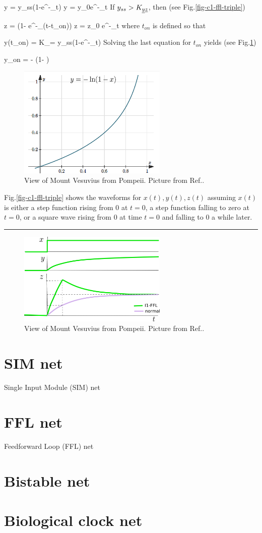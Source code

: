 \beq
y = y_{ss}(1-e^{-\alp_\rvy t})
\eeq
\beq \nonumber \color{red}
y = y_0e^{-\alp_\rvy t}
\eeq
If $y_{ss}> K_{\rvy\rvz}$, then (see Fig.\ref{fig-c1-ffl-triple})


\beq
z = \frac{\beta_\rvz}{\alp_\rvz}(1- e^{-\alp_\rvz (t-t_{on})})
\eeq
\beq\nonumber
\color{red}
z = z_0 e^{-\alp_\rvz t}
\eeq
where $t_{on}$ is defined so that

\beq
y(t_{on}) = K_{\rvy\rvz}= y_{ss}(1-e^{-\alp_\rvy t})
\eeq
Solving the last equation for $t_{on}$ yields (see 
Fig.\ref{fig-minus-log-1-minus-x.png})

\beq
y_{on} = -\;
\ln
\left({1- }
\right)
\eeq

\begin{figure}[h!]
\centering
\includegraphics[width=2.8in]
{autoregulons/-log(1-x).png}
\caption{View of Mount Vesuvius from
  Pompeii.
  Picture from Ref.\cite{alon-book}.}
\label{fig-minus-log-1-minus-x.png}
\end{figure}

Fig.\ref{fig-c1-ffl-triple}
shows the waveforms for $x(t), y(t), z(t)$
assuming $x(t)$ is either 
a step function rising from 0 at $t=0$,
a step function falling to zero at $t=0$,
or a square wave rising from 0 at time $t=0$
and falling to 0 a while later.

\hrule
\begin{figure}[h!]
\centering
\includegraphics[width=2.8in]
{autoregulons/i1-ffl-green.png}
\caption{View of Mount Vesuvius from
  Pompeii.
  Picture from Ref.\cite{alon-book}.}
\label{fig-i1-ffl}
\end{figure}

\section{SIM net}
Single Input Module (SIM) net

\section{FFL net}

Feedforward Loop (FFL) net

\section{Bistable net}

\section{Biological clock net}